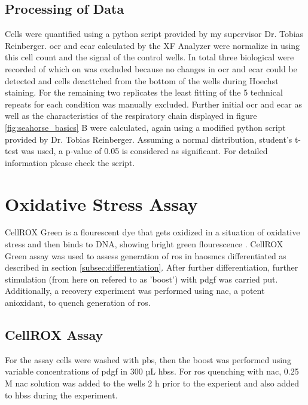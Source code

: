     \subsection{Processing of Data}
    Cells were quantified using a python script provided by my supervisor Dr. Tobias Reinberger. \ac{ocr} and \ac{ecar} calculated by the XF Analyzer were normalize in using this cell count and the signal of the control wells.
    In total three biological were recorded of which on was excluded because no changes in \ac{ocr} and \ac{ecar} could be detected and cells deacttched from the bottom of the wells during Hoechst staining. For the remaining two replicates the least fitting of the 5 technical repeats for each condition was manually excluded.
    Further initial \ac{ocr} and \ac{ecar} as well as the characteristics of the respiratory chain displayed in figure \ref{fig:seahorse_basics} B were calculated, again using a modified python script provided by Dr. Tobias Reinberger. Assuming a normal distribution, student's t-test was used, a p-value of 0.05 is considered as significant. For detailed information please check the script.

\section{Oxidative Stress Assay}
\label{sec:cellrox}
CellROX Green is a flourescent dye that gets oxidized in a situation of oxidative stress and then binds to DNA, showing bright green flourescence \cite{CellROXGreenReagent}.
CellROX Green assay was used to assess generation of \ac{ros} in \acp{haosmc} differentiated as described in section \ref{subsec:differentiation}. After further differentiation, further stimulation (from here on refered to as 'boost') with \ac{pdgf} was carried put. Additionally, a recovery experiment was performed using \ac{nac}, a potent anioxidant, to quench generation of \ac{ros}.

    \subsection{CellROX Assay}
For the assay cells were washed with \ac{pbs}, then the boost was performed using variable concentrations of \ac{pdgf} in 300 µL \ac{hbss}. For \ac{ros} quenching with \ac{nac}, 0.25 M \ac{nac} solution was added to the wells 2 h prior to the experient and also added to \ac{hbss} during the experiment.

